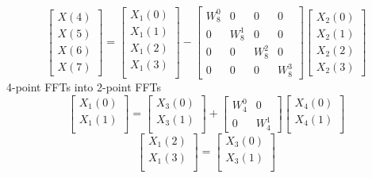 \documentclass[journal,12pt,twocolumn]{IEEEtran}
\renewcommand\thesection{\arabic{section}}
\begin{document}
\begin{enumerate}[label=\arabic*.,ref=\thesection.\theenumi]
\begin{equation}
\begin{bmatrix}
X(4) \\ 
X(5) \\ 
X(6) \\ 
X(7)
\end{bmatrix}
=
\begin{bmatrix}
X_{1}(0) \\ 
X_{1}(1)\\ 
X_{1}(2)\\
X_{1}(3)\\
\end{bmatrix}
-
\begin{bmatrix}
W^{0}_{8} & 0 & 0 & 0\\
0 & W^{1}_{8} & 0 & 0\\
0 & 0 & W^{2}_{8} & 0\\
0 & 0 & 0 & W^{3}_{8}
\end{bmatrix}
\begin{bmatrix}
X_{2}(0) \\ 
X_{2}(1) \\ 
X_{2}(2) \\
X_{2}(3)
\end{bmatrix}
\end{equation}
4-point FFTs into 2-point FFTs
\begin{equation}
\begin{bmatrix}
X_{1}(0) \\ 
X_{1}(1)\\ 
\end{bmatrix}
=
\begin{bmatrix}
X_{3}(0) \\ 
X_{3}(1)\\ 
\end{bmatrix}
+
\begin{bmatrix}
W^{0}_{4} & 0\\
0 & W^{1}_{4}
\end{bmatrix}
\begin{bmatrix}
X_{4}(0) \\ 
X_{4}(1) \\ 
\end{bmatrix}
\end{equation}
\begin{equation}
\begin{bmatrix}
X_{1}(2) \\ 
X_{1}(3)\\ 
\end{bmatrix}
=
\begin{bmatrix}
X_{3}(0) \\ 
X_{3}(1)\\ 
\end{bmatrix}

\end{equation}
\end{enumerate}
\end{document}
